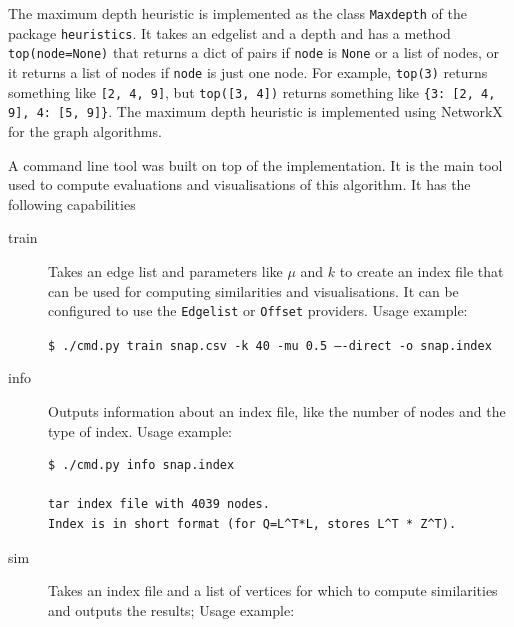 \documentclass[12pt]{report}
\begin{document}
The maximum depth heuristic is implemented as the class {\tt Maxdepth} of the
package {\tt heuristics}. It takes an edgelist and a depth and has a method
{\tt top(node=None)} that returns a dict of pairs if {\tt node} is {\tt None} or
a list of nodes, or it returns a list of nodes if {\tt node} is just one node.
For example, {\tt top(3)} returns something like {\tt [2, 4, 9]}, but
{\tt top([3, 4])} returns something like {\tt \{3: [2, 4, 9], 4: [5, 9]\}}. The
maximum depth heuristic is implemented using NetworkX \cite{networkx} for the
graph algorithms.


A command line tool was built on top of the implementation. It is the main tool
used to compute evaluations and visualisations of this algorithm. It has the
following capabilities

\begin{description}
  \item[train] Takes an edge list and parameters like $\mu$ and $k$ to create
    an index file that can be used for computing similarities and visualisations.
    It can be configured to use the {\tt Edgelist} or {\tt Offset} providers.
    Usage example:

    {\tt \$ ./cmd.py train snap.csv -k 40 -mu 0.5 ----direct -o snap.index}
  \item[info] Outputs information about an index file, like the number of nodes
    and the type of index. Usage example:

    \begin{lstlisting}
$ ./cmd.py info snap.index

tar index file with 4039 nodes.
Index is in short format (for Q=L^T*L, stores L^T * Z^T).
    \end{lstlisting}
  \item[sim] Takes an index file and a list of vertices for which to compute
    similarities and outputs the results; Usage example:


\end{description}
\end{document}
